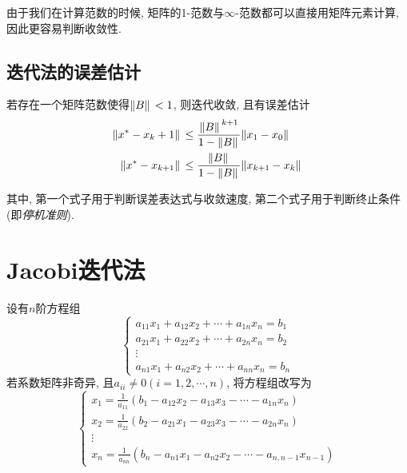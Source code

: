 由于我们在计算范数的时候, 矩阵的1-范数与$\infty$-范数都可以直接用矩阵元素计算, 因此更容易判断收敛性.

\subsection{迭代法的误差估计}

\begin{theorem}
    若存在一个矩阵范数使得$\norm*{B}<1$, 则迭代收敛, 且有误差估计
    \begin{align*}
        \norm*{x^*-{x_k+1}}&\le\frac{\norm*{B}^{k+1}}{1-\norm*{B}}\norm*{x_1-x_0}\\
        \norm*{x^*-x_{k+1}}&\le\frac{\norm*{B}}{1-\norm*{B}}\norm*{x_{k+1}-x_k}
    \end{align*}

    其中, 第一个式子用于判断误差表达式与收敛速度, 第二个式子用于判断终止条件(即\emph{停机准则}).
\end{theorem}

\section{Jacobi迭代法}

设有$n$阶方程组
\begin{equation*}
    \begin{cases}
        a_{11}x_1+a_{12}x_2+\cdots+a_{1n}x_n=b_1\\
        a_{21}x_1+a_{22}x_2+\cdots+a_{2n}x_n=b_2\\
        \vdots\\
        a_{n1}x_1+a_{n2}x_2+\cdots+a_{nn}x_n=b_n
    \end{cases}
\end{equation*}
若系数矩阵非奇异, 且$a_{ii}\ne0(i=1,2,\cdots,n)$, 将方程组改写为
\begin{equation*}
    \begin{cases}
        x_1=\frac{1}{a_{11}}(b_1-a_{12}x_2-a_{13}x_3-\cdots-a_{1n}x_n)\\
        x_2=\frac{1}{a_{22}}(b_2-a_{21}x_1-a_{23}x_3-\cdots-a_{2n}x_n)\\
        \vdots\\
        x_n=\frac{1}{a_{nn}}(b_n-a_{n1}x_1-a_{n2}x_2-\cdots-a_{n,n-1}x_{n-1})
    \end{cases}
\end{equation*}

